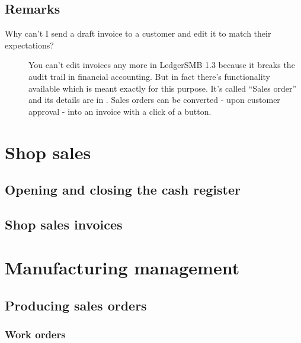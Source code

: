 \section{Remarks}
\label{sec-business-processes-accounting-remarks}


\begin{description}
\item [Why can't I send a draft invoice to a \gls{customer} and edit it
   to match their expectations?] 
You can't edit invoices any more in LedgerSMB 1.3 because it breaks the audit trail
in financial accounting. But in fact there's functionality available which is meant
exactly for this purpose. It's called ``Sales order'' and its details are in
. Sales orders can be converted - upon \gls{customer} approval -
into an invoice with a click of a button.
\end{description}


\chapter{Shop sales}
\label{cha-business-processes-shop-sales}

\section{Opening and closing the cash register}
\label{sec-business-processes-shop-register-opening-closing}

\section{Shop sales invoices}
\label{sec-business-processes-shop-invoicing}

\chapter{Manufacturing management}
\label{cha-business-processes-manufacturing}

\section{Producing sales orders}
\label{sec-business-processes-manufacturing-producing-orders}

\subsection{Work orders}
\label{sec-business-processes-manufacturing-work-orders}

